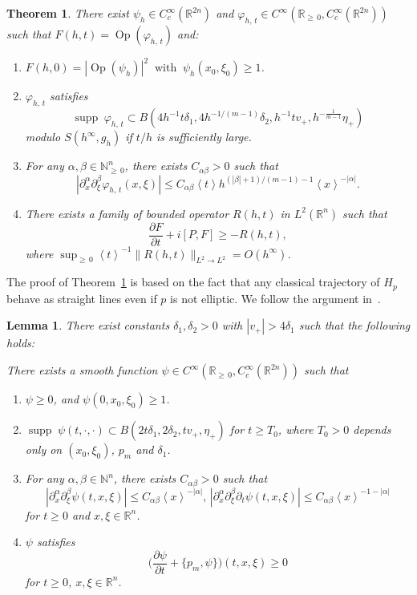 \documentclass[10pt]{amsart}
\newtheorem{theo}[cdrthm]{Theorem}
\newtheorem{lemm}[cdrthm]{Lemma}
\theoremstyle{definition}
\renewcommand*\a{\alpha}
\renewcommand*\b{\beta}
\renewcommand*\d{\delta}
\newcommand*\f{\varphi}
\newcommand*\g{\psi}
\newcommand*\x{\xi}
\newcommand*\y{\eta}
\DeclareMathOperator{\Op}{Op}
\newcommand*\re{\mathbb{R}}
\newcommand{\bbN}{\mathbb{N}}
\newcommand*\pa{\partial}
\DeclareMathOperator{\supp}{supp\;}
\newcommand{\jap}[1]{\left\langle #1 \right\rangle}
\newcommand{\biggpare}[1]{\biggl(#1\biggr)}
\newcommand*{\romanenumi}{\renewcommand*{\theenumi}{\roman{enumi}}}
\begin{document}
\begin{theo}\label{sing}
There exist $\g_{h}\in C_c^\infty(\re^{2n})$ and $\f_{h,\,t} \in C^{\infty}(\re_{\geq\,0},C_c^{\infty}(\re^{2n}))$ such that $F(h,t) = \Op(\f_{h,\,t})$ and:
\begin{enumerate}\romanenumi
\item\label{theoB1.1} $F(h,0) =|\Op(\g_{h})|^2\;\; \text{with}\;\; \g_{h}(x_0,\x_0) \geq 1$.
\item\label{theoB1.2} $\f_{h,\,t}$ satisfies
\[
\supp \f_{h,\,t}\subset B\left(4h^{-1}t\d_1,4h^{-1/(m-1)}\d_2,h^{-1}tv_+,h^{-\frac{1}{m-1}}\y_+\right)
\]
modulo $S(h^{\infty},g_h)$ if $t/h$ is sufficiently large.
\item\label{theoB1.3} For any $\a,\b\in \bbN_{\geq\,0}^n$, there exists $C_{\a\b}>0$ such that
\[
\left|\pa_x^{\a}\pa_{\x}^{\b}\f_{h,\,t}(x,\x)\right|\leq C_{\a\b}\jap{t} h^{(|\b|+1)/(m-1)-1} \jap{x}^{-|\a|}.
\]
\item\label{theoB1.4} There exists a family of bounded operator $R(h,t)$ in $L^2(\re^n)$ such that
\[
\frac{\pa F}{\pa t} + i[P, F] \geq -R(h,t),
\]
where $\sup_{\geq\,0} \jap{t}^{-1}\|R(h,t)\|_{L^2\rightarrow L^2} = O(h^{\infty})$.
\end{enumerate}
\end{theo}


The proof of Theorem~\ref{sing} is based on the fact that any classical trajectory of $H_p$ behave as straight lines even if $p$ is not elliptic. We follow the argument in~\cite{N}.


\begin{lemm}\label{sym}
There exist constants $\d_1, \d_2 >0$ with $|v_+|>4\d_1$ such that the following holds:

There exists a smooth function $\g \in C^{\infty}(\re_{\geq\,0}, C_c^{\infty}(\re^{2n}))$ such that
\begin{enumerate}\romanenumi
\item \label{lemmB2.1}$\g \geq 0$, and $\g(0, x_0, \x_0) \geq 1$.
\item \label{lemmB2.2}$\supp \g(t, \cdot, \cdot) \subset B(2t\d_1,2\d_2,tv_+,\y_+)$ for $t\geq T_0$, where $T_0>0$ depends only on $(x_0,\x_0)$, $p_m$ and $\d_1$.
\item \label{lemmB2.3}For any $\a,\b \in \bbN^n$, there exists $C_{\a\b}>0$ such that
\[
\left|\pa_x^{\a}\pa_{\x}^{\b}\g(t,x,\x)\right|\leq C_{\a\b}\jap{x}^{-|\a|},\,\left|\pa_x^{\a}\pa_{\x}^{\b}\pa_t\g(t,x,\x)\right|\leq C_{\a\b}\jap{x}^{-1-|\a|}
\]
for $t\geq 0$ and $x,\x \in \re^n$.
\item \label{lemmB2.4}$\g$ satisfies
\[
\biggpare{\frac{\pa \g}{\pa t} + \{p_m, \g \}}(t, x,\x) \geq 0
\]
for $t\geq 0$, $x,\x \in \re^n$.
\end{enumerate}
\end{lemm}
\end{document}
